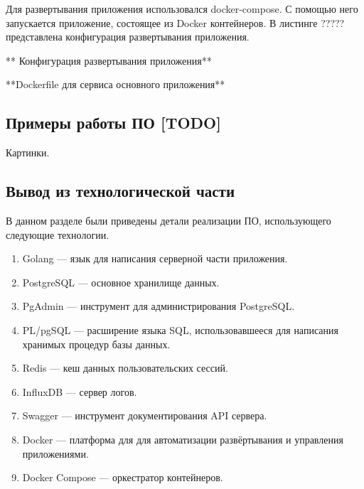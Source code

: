 Для развертывания приложения использовался docker-compose. С помощью него запускается приложение, состоящее из Docker контейнеров. В листинге ????? представлена конфигурация развертывания приложения.

** Конфигурация развертывания приложения**

**Dockerfile для сервиса основного приложения**

\subsection{Примеры работы ПО [TODO]}

Картинки.



\subsection{Вывод из технологической части}

В данном разделе были приведены детали реализации ПО, использующего следующие технологии.

\begin{enumerate}[label*=\arabic*.]
	\item Golang --- язык для написания серверной части приложения.
	\item PostgreSQL --- основное хранилище данных.
	\item PgAdmin --- инструмент для администрирования PostgreSQL.
	\item PL/pgSQL --- расширение языка SQL, использовавшееся для написания хранимых процедур базы данных.
	\item Redis --- кеш данных пользовательских сессий.
	\item InfluxDB --- сервер логов.
	\item Swagger --- инструмент документирования API сервера.
	\item Docker --- платформа для для автоматизации развёртывания и управления приложениями.
	\item Docker Compose --- оркестратор контейнеров.
\end{enumerate}

\pagebreak